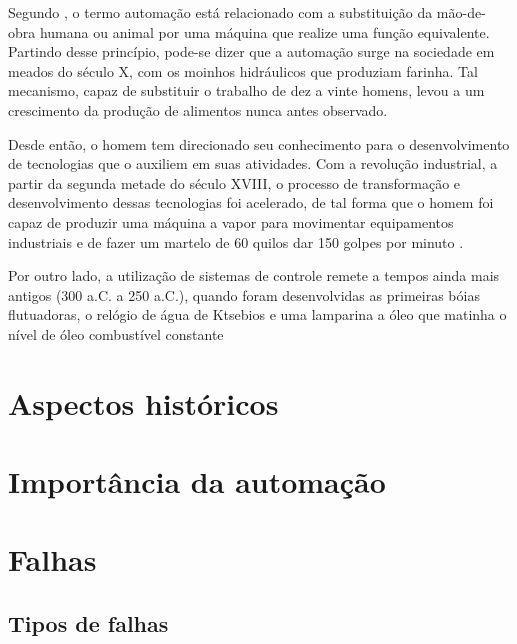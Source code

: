 \label{cap:introducao}

Segundo , o termo automação está relacionado com a
substituição da mão-de-obra humana ou animal por uma máquina que realize uma
função equivalente. Partindo desse princípio, pode-se dizer que a automação
surge na sociedade em meados do século X, com os moinhos hidráulicos que
produziam farinha. Tal mecanismo, capaz de substituir o trabalho de dez a vinte
homens, levou a um crescimento da produção de alimentos nunca antes observado.

Desde então, o homem tem direcionado seu conhecimento para o desenvolvimento de
tecnologias que o auxiliem em suas atividades. Com a revolução industrial, a
partir da segunda metade do século XVIII, o processo de transformação e
desenvolvimento dessas tecnologias foi acelerado, de tal forma que o homem foi
capaz de produzir uma máquina a vapor para movimentar equipamentos industriais e
de fazer um martelo de 60 quilos dar 150 golpes por minuto \cite{goeking:2010}.

Por outro lado, a utilização de sistemas de controle remete a tempos ainda mais
antigos (300 a.C. a 250 a.C.), quando foram desenvolvidas as primeiras bóias
flutuadoras, o relógio de água de Ktsebios e uma lamparina a óleo que matinha o
nível de óleo combustível constante %

\section{Aspectos históricos}




\section{Importância da automação}

\section{Falhas}

\subsection{Tipos de falhas}

